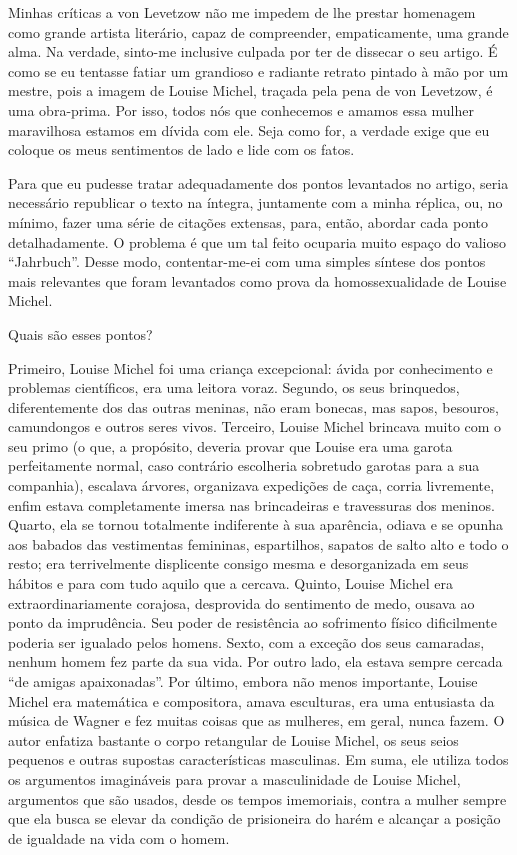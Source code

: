 Minhas críticas a von Levetzow não me impedem de lhe prestar homenagem
como grande artista literário, capaz de compreender, empaticamente, uma
grande alma. Na verdade, sinto-me inclusive culpada por ter de dissecar
o seu artigo. É como se eu tentasse fatiar um grandioso e radiante
retrato pintado à mão por um mestre, pois a imagem de Louise Michel,
traçada pela pena de von Levetzow, é uma obra-prima. Por isso, todos nós
que conhecemos e amamos essa mulher maravilhosa estamos em dívida com
ele. Seja como for, a verdade exige que eu coloque os meus sentimentos
de lado e lide com os fatos.

Para que eu pudesse tratar adequadamente dos pontos levantados no
artigo, seria necessário republicar o texto na íntegra, juntamente com a
minha réplica, ou, no mínimo, fazer uma série de citações extensas,
para, então, abordar cada ponto detalhadamente. O problema é que um tal
feito ocuparia muito espaço do valioso ``Jahrbuch''. Desse modo,
contentar-me-ei com uma simples síntese dos pontos mais relevantes que
foram levantados como prova da homossexualidade de Louise Michel.

Quais são esses pontos?

Primeiro, Louise Michel foi uma criança excepcional: ávida por
conhecimento e problemas científicos, era uma leitora voraz. Segundo, os
seus brinquedos, diferentemente dos das outras meninas, não eram
bonecas, mas sapos, besouros, camundongos e outros seres vivos.
Terceiro, Louise Michel brincava muito com o seu primo (o que, a
propósito, deveria provar que Louise era uma garota perfeitamente
normal, caso contrário escolheria sobretudo garotas para a sua
companhia), escalava árvores, organizava expedições de caça, corria
livremente, enfim estava completamente imersa nas brincadeiras e
travessuras dos meninos. Quarto, ela se tornou totalmente indiferente à
sua aparência, odiava e se opunha aos babados das vestimentas femininas,
espartilhos, sapatos de salto alto e todo o resto; era terrivelmente
displicente consigo mesma e desorganizada em seus hábitos e para com
tudo aquilo que a cercava. Quinto, Louise Michel era extraordinariamente
corajosa, desprovida do sentimento de medo, ousava ao ponto da
imprudência. Seu poder de resistência ao sofrimento físico dificilmente
poderia ser igualado pelos homens. Sexto, com a exceção dos seus
camaradas, nenhum homem fez parte da sua vida. Por outro lado, ela
estava sempre cercada ``de amigas apaixonadas''. Por último, embora não
menos importante, Louise Michel era matemática e compositora, amava
esculturas, era uma entusiasta da música de Wagner e fez muitas coisas
que as mulheres, em geral, nunca fazem. O autor enfatiza bastante o
corpo retangular de Louise Michel, os seus seios pequenos e outras
supostas características masculinas. Em suma, ele utiliza todos os
argumentos imagináveis ​​para provar a masculinidade de Louise Michel,
argumentos que são usados, ​​desde os tempos imemoriais, contra a mulher
sempre que ela busca se elevar da condição de prisioneira do harém e
alcançar a posição de igualdade na vida com o homem.

